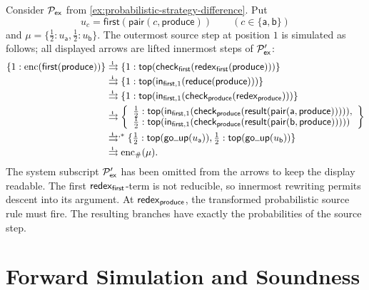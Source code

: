 \begin{example}
  \label{ex:transformed-producer}
  Consider \(\P_{\mathsf{ex}}\) from
  \cref{ex:probabilistic-strategy-difference}.  Put
  \[
    u_c=\mathsf{first}(\mathsf{pair}(c,\mathsf{produce}))
    \qquad(c\in\{\mathsf a,\mathsf b\})
  \]
  and \(\mu=\{\tfrac12:u_{\mathsf a},\tfrac12:u_{\mathsf b}\}\).  The
  outermost source step at position \(1\) is simulated as follows; all displayed
  arrows are lifted innermost steps of \(\P_{\mathsf{ex}}'\):
  \[
    \begin{aligned}
      \{1:\operatorname{enc}(\mathsf{first}(\mathsf{produce}))\}
      &\iliftto
      \{1:\ttop(\tcheck_{\mathsf{first}}(
        \tredex_{\mathsf{first}}(\mathsf{produce})))\}\\
      &\iliftto
      \{1:\ttop(\tin_{\mathsf{first},1}(
        \treduce(\mathsf{produce})))\}\\
      &\iliftto
      \{1:\ttop(\tin_{\mathsf{first},1}(
        \tcheck_{\mathsf{produce}}(\tredex_{\mathsf{produce}})))\}\\
      &\iliftto
      \left\{
        \begin{array}{l}
          \tfrac12:\ttop(\tin_{\mathsf{first},1}(
            \tcheck_{\mathsf{produce}}(
              \tresult(\mathsf{pair}(\mathsf a,\mathsf{produce}))))),\\[-1pt]
          \tfrac12:\ttop(\tin_{\mathsf{first},1}(
            \tcheck_{\mathsf{produce}}(
              \tresult(\mathsf{pair}(\mathsf b,\mathsf{produce})))))
        \end{array}
      \right\}\\
      &\iliftto^{,*}
      \{\tfrac12:\ttop(\tgoup(u_{\mathsf a})),
        \tfrac12:\ttop(\tgoup(u_{\mathsf b}))\}\\
      &\iliftto
      \operatorname{enc}_{\#}(\mu).
    \end{aligned}
  \]
  The system subscript \(\P'_{\mathsf{ex}}\) has been omitted from the arrows
  to keep the display readable.  The first
  \(\tredex_{\mathsf{first}}\)-term is not reducible, so
  innermost rewriting permits descent into its argument.  At
  \(\tredex_{\mathsf{produce}}\), the transformed probabilistic source rule
  must fire.  The resulting branches have exactly the probabilities of the
  source step.
\end{example}

\section{Forward Simulation and Soundness}
\label{sec:forward-simulation}

